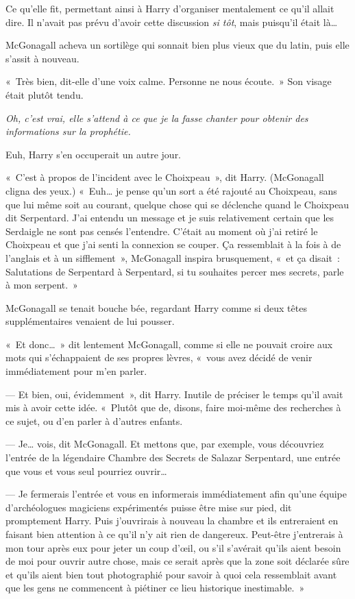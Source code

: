 Ce qu'elle fit, permettant ainsi à Harry d'organiser mentalement ce qu'il allait dire.
Il n'avait pas prévu d'avoir cette discussion \emph{si tôt}, mais puisqu'il était là…

McGonagall acheva un sortilège qui sonnait bien plus vieux que du latin, puis elle s'assit à nouveau.

«~Très bien, dit-elle d'une voix calme.
Personne ne nous écoute.~» Son visage était plutôt tendu.

\emph{Oh, c'est vrai, elle s'attend à ce que je la fasse chanter pour obtenir des informations sur la prophétie.}

Euh, Harry s'en occuperait un autre jour.

«~C'est à propos de l'incident avec le Choixpeau~», dit Harry.
(McGonagall cligna des yeux.)
«~Euh… je pense qu'un sort a été rajouté au Choixpeau, sans que lui même soit au courant, quelque chose qui se déclenche quand le Choixpeau dit Serpentard.
J'ai entendu un message et je suis relativement certain que les Serdaigle ne sont pas censés l'entendre.
C'était au moment où j'ai retiré le Choixpeau et que j'ai senti la connexion se couper.
Ça ressemblait à la fois à de l'anglais et à un sifflement~», McGonagall inspira brusquement, «~et ça disait~: Salutations de Serpentard à Serpentard, si tu souhaites percer mes secrets, parle à mon serpent.~»

McGonagall se tenait bouche bée, regardant Harry comme si deux têtes supplémentaires venaient de lui pousser.

«~Et donc…~» dit lentement McGonagall, comme si elle ne pouvait croire aux mots qui s'échappaient de ses propres lèvres, «~vous avez décidé de venir immédiatement pour m'en parler.

--- Et bien, oui, évidemment~», dit Harry.
Inutile de préciser le temps qu'il avait mis à avoir cette idée.
«~Plutôt que de, disons, faire moi-même des recherches à ce sujet, ou d'en parler à d'autres enfants.

--- Je… vois, dit McGonagall. Et mettons que, par exemple, vous découvriez l'entrée de la légendaire Chambre des Secrets de Salazar Serpentard, une entrée que vous et vous seul pourriez ouvrir…

--- Je fermerais l'entrée et vous en informerais immédiatement afin qu'une équipe d'archéologues magiciens expérimentés puisse être mise sur pied, dit promptement Harry.
Puis j'ouvrirais à nouveau la chambre et ils entreraient en faisant bien attention à ce qu'il n'y ait rien de dangereux.
Peut-être j'entrerais à mon tour après eux pour jeter un coup d'œil, ou s'il s'avérait qu'ils aient besoin de moi pour ouvrir autre chose, mais ce serait après que la zone soit déclarée sûre et qu'ils aient bien tout photographié pour savoir à quoi cela ressemblait avant que les gens ne commencent à piétiner ce lieu historique inestimable.~»


